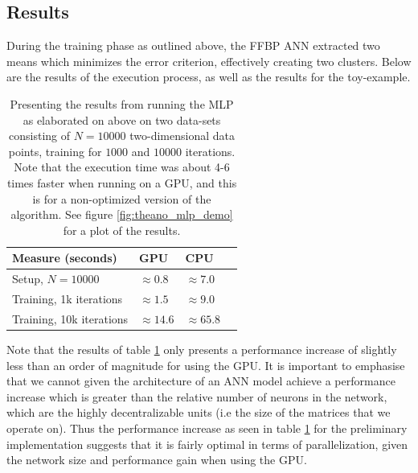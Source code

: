 \subsection{Results}

During the training phase as outlined above, the FFBP ANN extracted two means which minimizes the error criterion, effectively creating two clusters. Below are the results of the execution process, as well as the results for the toy-example.


\begin{table}
\begin{center}
    \begin{tabular}{ | l | l | l | l |}
    \hline
    \textbf{Measure (seconds)} & \textbf{GPU} & \textbf{CPU} \\ \hline
     Setup, $N=10 000$ & $\approx0.8$ & $\approx7.0$ \\ \hline
     Training, 1k iterations &  $\approx1.5$ & $\approx9.0$ \\ \hline
     Training, 10k iterations &  $\approx14.6$ & $\approx65.8$ \\ \hline
    \end{tabular}
\end{center}
\caption{Presenting the results from running the MLP as elaborated on above on two data-sets consisting of $N=10 000$ two-dimensional data points, training for $1000$ and $10 000$ iterations. Note that the execution time was about 4-6 times faster when running on a GPU, and this is for a non-optimized version of the algorithm. See figure \ref{fig:theano_mlp_demo} for a plot of the results.}
\label{tab:MLP_gpu_vs_cpu}
\end{table}

Note that the results of table \ref{tab:MLP_gpu_vs_cpu} only presents a performance increase of slightly less than an order of magnitude for using the GPU. It is important to emphasise that we cannot given the architecture of an ANN model achieve a performance increase which is greater than the relative number of neurons in the network, which are the highly decentralizable units (i.e the size of the matrices that we operate on). Thus the performance increase as seen in table \ref{tab:MLP_gpu_vs_cpu} for the preliminary implementation suggests that it is fairly optimal in terms of parallelization, given the network size and performance gain when using the GPU.

